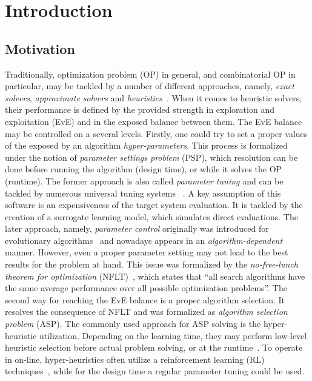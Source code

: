 \chapter{Introduction}\label{intro}

\section{Motivation}
Traditionally, optimization problem (OP) in general, and combinatorial OP in particular, may be tackled by a number of different approaches, namely, \emph{exact solvers}, \emph{approximate solvers} and \emph{heuristics}~\cite{junger2003combinatorial,biegler2004retrospective,festa2014brief}. When it comes to heuristic solvers, their performance is defined by the provided strength in exploration and exploitation (EvE) and in the exposed balance between them. The EvE balance may be controlled on a several levels. Firstly, one could try to set a proper values of the exposed by an algorithm \emph{hyper-parameters}. This process is formalized under the notion of \emph{parameter settings problem} (PSP), which resolution can be done before running the algorithm (design time), or while it solves the OP (runtime). The former approach is also called \emph{parameter tuning} and can be tackled by numerous universal tuning systems ~\cite{hutter2009paramils,hutter2011sequential,lopez2016irace,falkner2018bohb,brise2spl}. A key assumption of this software is an expensiveness of the target system evaluation. It is tackled by the creation of a surrogate learning model, which simulates direct evaluations. The later approach, namely, \emph{parameter control} originally was introduced for evolutionary algorithms~\cite{karafotias2014parameter} and nowadays appears in an \emph{algorithm-dependent} manner. However, even a proper parameter setting may not lead to the best results for the problem at hand. This issue was formalized by the \emph{no-free-lunch theorem for optimization} (NFLT)~\cite{wolpert1997no}, which states that ``all search algorithms have the same average performance over all possible optimization problems''. The second way for reaching the EvE balance is a proper algorithm selection. It resolves the consequence of NFLT and was formalized as \emph{algorithm selection problem} (ASP). The commonly used approach for ASP solving is the hyper-heuristic utilization. Depending on the learning time, they may perform low-level heuristic selection before actual problem solving, or at the runtime~\cite{burke2019classification}. To operate in on-line, hyper-heuristics often utilize a reinforcement learning (RL) techniques~\cite{moriarty1999evolutionary,mcclymont2011markov}, while for the design time a regular parameter tuning could be used.

